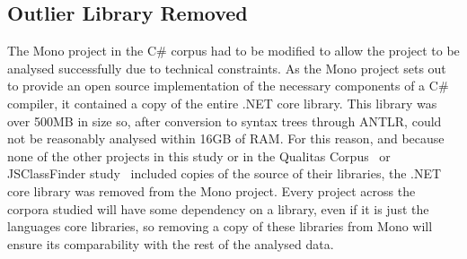 \subsection{Outlier Library Removed}
The Mono project in the C\# corpus had to be modified to allow the project to be analysed successfully due to technical constraints. As the Mono project sets out to provide an open source implementation of the necessary components of a C\# compiler, it contained a copy of the entire .NET core library. This library was over 500MB in size so, after conversion to syntax trees through ANTLR, could not be reasonably analysed within 16GB of RAM. For this reason, and because none of the other projects in this study or in the Qualitas Corpus~\cite{QualitasCorpus} or JSClassFinder study~\cite{JSClassFinder} included copies of the source of their libraries, the .NET core library was removed from the Mono project. Every project across the corpora studied will have some dependency on a library, even if it is just the languages core libraries, so removing a copy of these libraries from Mono will ensure its comparability with the rest of the analysed data.
\newline

